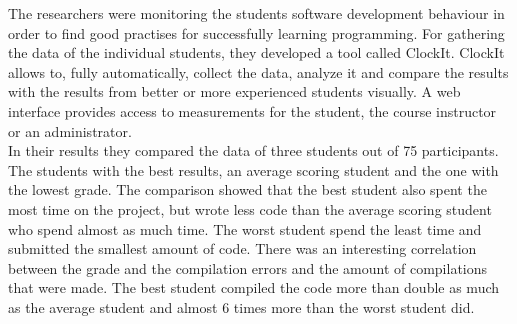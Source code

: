 The researchers were monitoring the students software development behaviour in order to find good practises for successfully learning programming. For gathering the data of the individual students, they developed a tool called ClockIt. ClockIt allows to, fully automatically, collect the data, analyze it and compare the results with the results from better or more experienced students visually. A web interface provides access to measurements for the student, the course instructor or an administrator.\\
In their results they compared the data of three students out of 75 participants. The students with the best results, an average scoring student and the one with the lowest grade. 
The comparison showed that the best student also spent the most time on the project, but wrote less code than the average scoring student who spend almost as much time. The worst student spend the least time and submitted the smallest amount of code. There was an interesting correlation between the grade and the compilation errors and the amount of compilations that were made. The best student compiled the code more than double as much as the average student and almost 6 times more than the worst student did. \cite{norris2008clockit}

